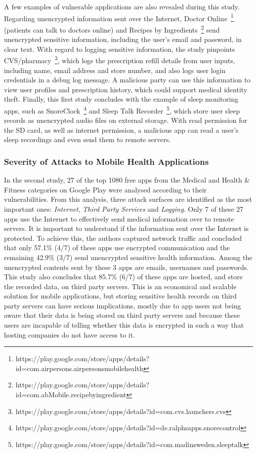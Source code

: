 A few examples of vulnerable applications are also revealed during this study. Regarding unencrypted information sent over the Internet, Doctor Online~\footnote{https://play.google.com/store/apps/details?id=com.airpersons.airpersonsmobilehealth} (patients can talk to doctors online) and Recipes by Ingredients~\footnote{https://play.google.com/store/apps/details?id=com.abMobile.recipebyingredient} send unencrypted sensitive information, including the user's email and password, in clear text. With regard to logging sensitive information, the study pinpoints CVS/pharmacy~\footnote{https://play.google.com/store/apps/details?id=com.cvs.launchers.cvs}, which logs the prescription refill details from user inputs, including name, email address and store number, and also logs user login credentials in a debug log message. A malicious party can use this information to view user profiles and prescription history, which could support medical identity theft. Finally, this first study concludes with the example of sleep monitoring apps, such as SnoreClock~\footnote{https://play.google.com/store/apps/details?id=de.ralphsapps.snorecontrol} and Sleep Talk Recorder~\footnote{https://play.google.com/store/apps/details?id=com.madinsweden.sleeptalk}, which store user sleep records as unencrypted audio files on external storage. With read permission for the SD card, as well as internet permission, a malicious app can read a user's sleep recordings and even send them to remote servers.

\subsubsection{Severity of Attacks to Mobile Health Applications}
In the second study, 27 of the top 1080 free apps from the Medical and Health \& Fitness categories on Google Play were analysed according to their vulnerabilities. From this analysis, three attack surfaces are identified as the most important ones: \emph{Internet}, \emph{Third Party Services} and \emph{Logging}. Only 7 of these 27 apps use the Internet to effectively send medical information over to remote servers. It is important to understand if the information sent over the Internet is protected. To achieve this, the authors captured network traffic and concluded that only 57.1\% (4/7) of these apps use encrypted communication and the remaining 42.9\% (3/7) send unencrypted sensitive health information. Among the unencrypted contents sent by these 3 apps are emails, usernames and passwords. This study also concludes that 85.7\% (6/7) of these apps are hosted, and store the recorded data, on third party servers. This is an economical and scalable solution for mobile applications, but storing sensitive health records on third party servers can have serious implications, mostly due to app users not being aware that their data is being stored on third party servers and because these users are incapable of telling whether this data is encrypted in such a way that hosting companies do not have access to it.

